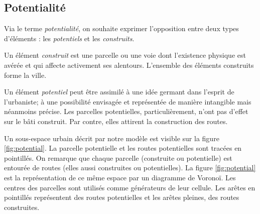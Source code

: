 \documentclass[12pt]{article}
\begin{document}
\subsection{Potentialité}

Via le terme \textit{potentialité}, on souhaite exprimer l'opposition
entre deux types d'éléments : les \textit{potentiels} et les
\textit{construits}.

Un élément \textit{construit} est une parcelle ou une voie dont
l'existence physique est avérée et qui affecte activement ses
alentours. L'ensemble des éléments construits forme la ville.

Un élément \textit{potentiel} peut être assimilé à une idée germant
dans l'esprit de l'urbaniste; à une possibilité envisagée et
représentée de manière intangible mais néanmoins précise. Les
parcelles potentielles, particulièrement, n'ont pas d'effet sur le
bâti construit. Par contre, elles attirent la construction des routes.

Un sous-espace urbain décrit par notre modèle est visible sur la
figure \ref{fig:potential}. La parcelle
potentielle et les routes potentielles sont tracées en pointillés. On
remarque que chaque parcelle (construite ou potentielle) est entourée
de routes (elles aussi construites ou potentielles). La figure
\ref{fig:potential} est la
représentation de ce même espace par un diagramme de Voronoï. Les
centres des parcelles sont utilisés comme générateurs de leur
cellule. Les arêtes en pointillés représentent des routes potentielles
et les arêtes pleines, des routes construites.
\end{document}
